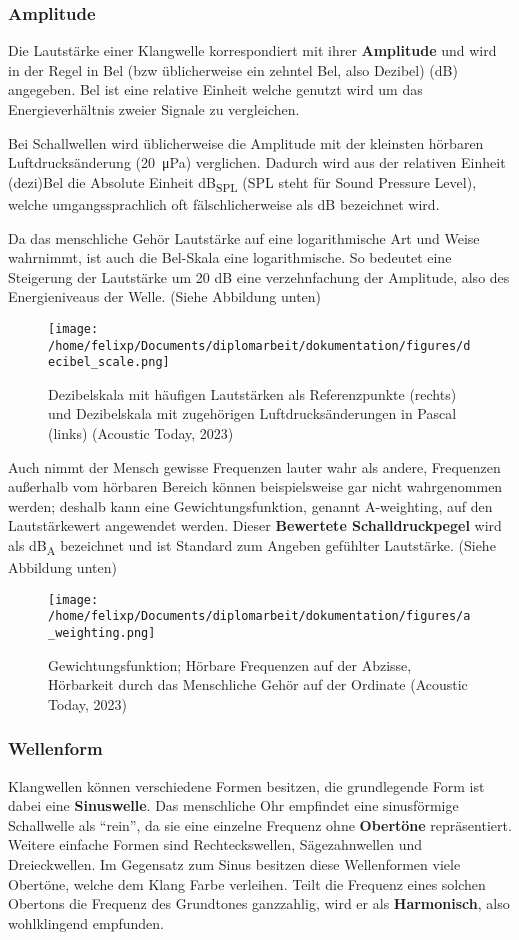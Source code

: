 \subsubsection{Amplitude}
\label{sec:org5478080}
Die Lautstärke einer Klangwelle korrespondiert mit ihrer \textbf{Amplitude} und wird in der Regel in Bel (bzw üblicherweise ein zehntel Bel, also Dezibel) (\si{\dB}) angegeben. Bel ist eine relative Einheit welche genutzt wird um das Energieverhältnis zweier Signale zu vergleichen.

Bei Schallwellen wird üblicherweise die Amplitude mit der kleinsten hörbaren Luftdrucksänderung (\SI{20}{\micro\pascal}) verglichen. Dadurch wird aus der relativen Einheit (dezi)Bel die Absolute Einheit \si{\dB}\textsubscript{SPL} (SPL steht für Sound Pressure Level), welche umgangssprachlich oft fälschlicherweise als \si{\dB} bezeichnet wird.

Da das menschliche Gehör Lautstärke auf eine logarithmische Art und Weise wahrnimmt, ist auch die Bel-Skala eine logarithmische. So bedeutet eine Steigerung der Lautstärke um 20 \si{\dB} eine verzehnfachung der Amplitude, also des Energieniveaus der Welle. (Siehe Abbildung unten)

\begin{figure}[htbp]
\centering
\texttt{[image: /home/felixp/Documents/diplomarbeit/dokumentation/figures/decibel\_scale.png]}
\caption{Dezibelskala mit häufigen Lautstärken als Referenzpunkte (rechts) und Dezibelskala mit zugehörigen Luftdrucksänderungen in Pascal (links) ({Acoustic Today}, 2023)}
\end{figure}

Auch nimmt der Mensch gewisse Frequenzen lauter wahr als andere, Frequenzen außerhalb vom hörbaren Bereich können beispielsweise gar nicht wahrgenommen werden; deshalb kann eine Gewichtungsfunktion, genannt A-weighting, auf den Lautstärkewert angewendet werden. Dieser \textbf{Bewertete Schalldruckpegel} wird als \si{\dB}\textsubscript{A} bezeichnet und ist Standard zum Angeben gefühlter Lautstärke. (Siehe Abbildung unten)

\begin{figure}[htbp]
\centering
\texttt{[image: /home/felixp/Documents/diplomarbeit/dokumentation/figures/a\_weighting.png]}
\caption{Gewichtungsfunktion; Hörbare Frequenzen auf der Abzisse, Hörbarkeit durch das Menschliche Gehör auf der Ordinate ({Acoustic Today}, 2023)}
\end{figure}

\subsubsection{Wellenform}
\label{sec:org3a53afe}
Klangwellen können verschiedene Formen besitzen, die grundlegende Form ist dabei eine \textbf{Sinuswelle}. Das menschliche Ohr empfindet eine sinusförmige Schallwelle als "`rein"', da sie eine einzelne Frequenz ohne \textbf{Obertöne} repräsentiert. Weitere einfache Formen sind Rechteckswellen, Sägezahnwellen und Dreieckwellen. Im Gegensatz zum Sinus besitzen diese Wellenformen viele Obertöne, welche dem Klang Farbe verleihen. Teilt die Frequenz eines solchen Obertons die Frequenz des Grundtones ganzzahlig, wird er als \textbf{Harmonisch}, also wohlklingend empfunden.

